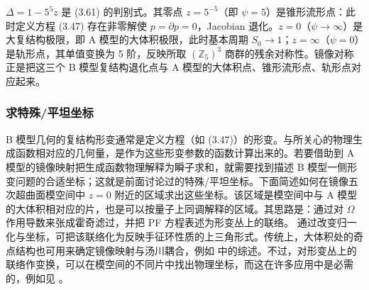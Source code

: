 \begin{yizhu}[物理图像]
$\Delta=1-5^5z$ 是 (3.61) 的判别式。其零点 $z=5^{-5}$（即 $\psi=5$）是锥形流形点：此时定义方程 (3.47) 存在非零解使 $p=\partial p=0$，Jacobian 退化。$z=0$（$\psi\to\infty$）是大复结构极限，即 A 模型的大体积极限，此时基本周期 $S_0\to1$；$z=\infty$（$\psi=0$）是轨形点，其单值变换为 5 阶，反映所取 $(\mathbb{Z}_5)^3$ 商群的残余对称性。镜像对称正是把这三个 B 模型复结构退化点与 A 模型的大体积点、锥形流形点、轨形点对应起来。
\end{yizhu}

\subsubsection{求特殊/平坦坐标}
\label{sec:3.6.3}

B 模型几何的复结构形变通常是定义方程（如 (3.47)）的形变。与所关心的物理生成函数相对应的几何量，是作为这些形变参数的函数计算出来的。若要借助到 A 模型的镜像映射把生成函数物理解释为瞬子求和，就需要找到描述 B 模型一侧形变问题的合适坐标；这就是前面讨论过的特殊/平坦坐标。下面简述如何在镜像五次超曲面模空间中 $z=0$ 附近的区域求出这些坐标。该区域是模空间中与 A 模型的大体积相对应的片，也是可以按量子上同调解释的区域。其思路是：通过对 $\Omega$ 作用导数来张成霍奇滤过，并把 PF 方程表述为形变丛上的联络。
通过改变归一化与坐标，可把该联络化为反映手征环性质的上三角形式。传统上，大体积处的奇点结构也可用来确定镜像映射与汤川耦合，例如 \cite{ref48} 中的综述。不过，对形变丛上的联络作变换，可以在模空间的不同片中找出物理坐标，而这在许多应用中是必需的，例如见 \cite{ref61,ref62,ref28}。

